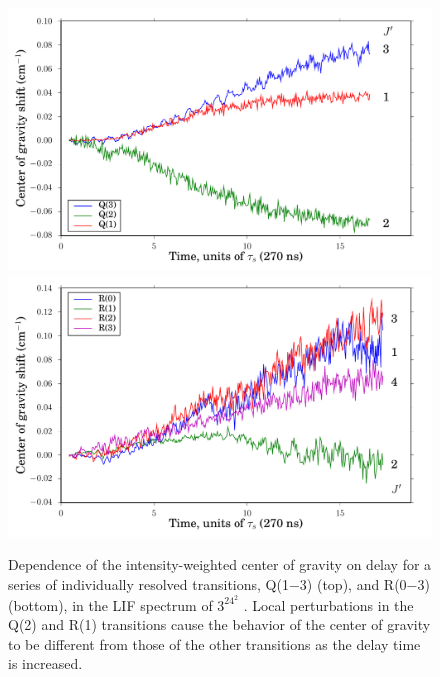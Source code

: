 \begin{figure}
  \caption{Dependence of the intensity-weighted center of gravity on
    delay for a series of individually resolved transitions, Q(1$-$3)
    (top), and R(0$-$3) (bottom), in the LIF spectrum of $3^24^2$
    .  Local perturbations in the Q(2) and R(1) transitions
    cause the behavior of the center of gravity to be different from 
    those of the other transitions as the delay time is increased.  
  }
  \label{fig:32b2-cog-delay}
  \centering
  \vspace{5mm}
  \includegraphics[width=6in]{32b2-q123-cog-delay.pdf}
  \includegraphics[width=6in]{32b2-r0123-cog-delay.pdf}
\end{figure}



